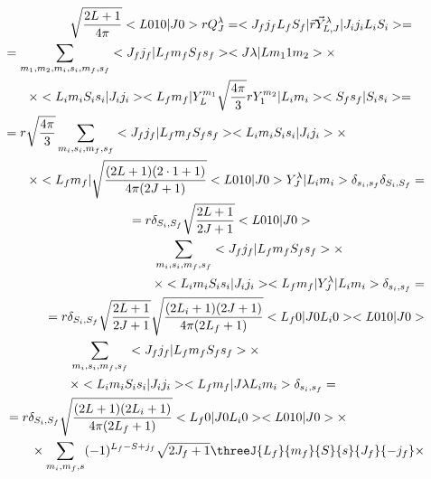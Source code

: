 \begin{align}
    \begin{split}
        &\sqrt{\frac{2L+1}{4\pi}} <L 0 1 0 | J 0> r Q_{J}^\lambda = <J_f j_f L_f S_f|\vec{r} \vec{Y}^{\lambda}_{L, J}|J_i j_i L_i S_i> =
    \end{split} \\
    \begin{split}
        &= \sum_{m_1, m_2, m_i, s_i, m_f, s_f} <J_f j_f| L_f m_f S_f s_f> <J \lambda| L m_1 1 m_2> \times \\
        &\qquad\times <L_i m_i S_i s_i | J_i j_i> <L_f m_f| Y_L^{m_1} \sqrt{\frac{4 \pi}{3}} r Y_{1}^{m_2}|L_i m_i> <S_f s_f|S_i s_i> = \\
        &= r \sqrt{\frac{4 \pi}{3}} \sum_{m_i, s_i, m_f, s_f} <J_f j_f| L_f m_f S_f s_f> <L_i m_i S_i s_i | J_i j_i> \times \\
        &\qquad\times <L_f m_f| \sqrt{\frac{(2L+1)(2\cdot1+1)}{4 \pi (2J + 1)}} <L 0 1 0 | J 0> Y_J^\lambda|L_i m_i> \delta_{s_i, s_f} \delta_{S_i, S_f} = \\
    \end{split} \\
    \begin{split}
        &= r \delta_{S_i, S_f} \sqrt{\frac{2L+1}{2J+1}} <L 0 1 0 | J 0> \\
        &\qquad\sum_{m_i, s_i, m_f, s_f} <J_f j_f| L_f m_f S_f s_f> \times \\
        &\qquad\times <L_i m_i S_i s_i | J_i j_i> <L_f m_f| Y_J^\lambda |L_i m_i> \delta_{s_i, s_f} =
    \end{split} \\
    \begin{split}
        &= r \delta_{S_i, S_f} \sqrt{\frac{2L+1}{2J+1}} \sqrt{\frac{(2L_i+1)(2J+1)}{4 \pi (2L_f+1)}} <L_f 0 | J 0 L_i 0> <L 0 1 0 | J 0> \\
        &\qquad \sum_{m_i, s_i, m_f, s_f} <J_f j_f| L_f m_f S_f s_f> \times \\
        &\qquad\times <L_i m_i S_i s_i | J_i j_i> <L_f m_f| J \lambda L_i m_i> \delta_{s_i, s_f} =
    \end{split} \\
    \begin{split}
        &= r \delta_{S_i, S_f} \sqrt{\frac{(2L+1) (2L_i + 1)}{4 \pi (2L_f+1)}} <L_f 0  | J 0 L_i 0> <L 0 1 0 | J 0> \times \\
        &\qquad\times \sum_{m_i, m_f, s} (-1)^{L_f-S + j_f} \sqrt{2J_f+1} \threeJ{L_f}{m_f}{S}{s}{J_f}{-j_f} \times \\

\end{split}
\end{align}
